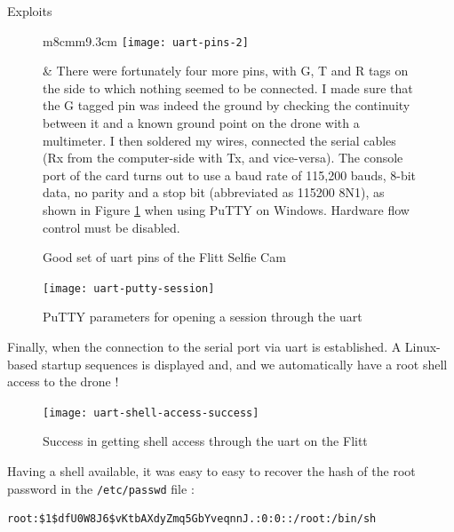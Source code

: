 \begin{chaptercover}{Exploits}
\begin{figure}[H]
\begin{center}
\begin{tabular}{m{8cm}m{9.3cm}}
  \texttt{[image: uart-pins-2]}
  \caption{Good set of \acrshort{uart} pins of the Flitt Selfie Cam}
  & There were fortunately four more pins, with G, T and R tags on the side to which nothing seemed to be connected. I made sure that the G tagged pin was indeed the ground by checking the continuity between it and a known ground point on the drone with a multimeter. I then soldered my wires, connected the serial cables (Rx from the computer-side with Tx, and vice-versa). The console port of the card turns out to use a baud rate of 115,200 bauds, 8-bit data, no parity and a stop bit (abbreviated as 115200 8N1), as shown in Figure \ref{fig:uart-putty-session} when using PuTTY on Windows. Hardware flow control must be disabled. \\
\end{tabular}
\end{center}
\end{figure}

\begin{figure}[H]
  \centering
  \texttt{[image: uart-putty-session]}
  \caption{PuTTY parameters for opening a session through the \acrshort{uart}}
  \label{fig:uart-putty-session}
\end{figure}

Finally, when the connection to the serial port via \acrshort{uart} is established. A Linux-based startup sequences is displayed and, and we automatically have a root shell access to the drone !

\begin{figure}[H]
  \centering
  \texttt{[image: uart-shell-access-success]}
  \caption{Success in getting shell access through the \acrshort{uart} on the Flitt}
  \label{fig:uart-shell-access-success}
\end{figure}

Having a shell available, it was easy to easy to recover the hash of the root password in the \texttt{/etc/passwd} file : 

\begin{center}
\begin{minipage}{.95\linewidth}
\begin{lstlisting}
root:$1$dfU0W8J6$vKtbAXdyZmq5GbYveqnnJ.:0:0::/root:/bin/sh
\end{lstlisting}
\end{minipage}
\end{center}


\end{chaptercover}
